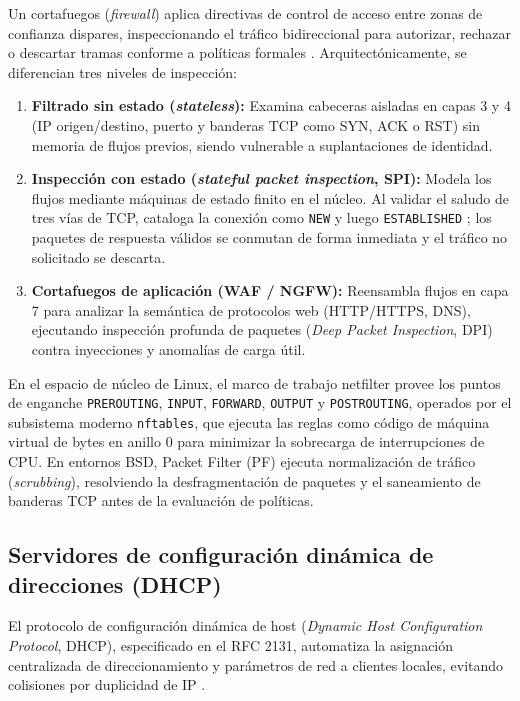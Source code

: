 \documentclass[12pt]{article}
\begin{document}
Un cortafuegos (\textit{firewall}) aplica directivas de control de acceso entre zonas de confianza dispares, inspeccionando el tráfico bidireccional para autorizar, rechazar o descartar tramas conforme a políticas formales \parencite[\S 19.3, pp.\ 942--944]{deitel2004operating}. Arquitectónicamente, se diferencian tres niveles de inspección:
\begin{enumerate}[noitemsep, topsep=1pt, parsep=0pt]
    \item \textbf{Filtrado sin estado (\textit{stateless}):} Examina cabeceras aisladas en capas 3 y 4 (IP origen/destino, puerto y banderas TCP como SYN, ACK o RST) sin memoria de flujos previos, siendo vulnerable a suplantaciones de identidad.
    \item \textbf{Inspección con estado (\textit{stateful packet inspection}, SPI):} Modela los flujos mediante máquinas de estado finito en el núcleo. Al validar el saludo de tres vías de TCP, cataloga la conexión como \texttt{NEW} y luego \texttt{ESTABLISHED} \parencite[\S 19.3, p.\ 943]{deitel2004operating}; los paquetes de respuesta válidos se conmutan de forma inmediata y el tráfico no solicitado se descarta.
    \item \textbf{Cortafuegos de aplicación (WAF / NGFW):} Reensambla flujos en capa 7 para analizar la semántica de protocolos web (HTTP/HTTPS, DNS), ejecutando inspección profunda de paquetes (\textit{Deep Packet Inspection}, DPI) contra inyecciones y anomalías de carga útil.
\end{enumerate}

En el espacio de núcleo de Linux, el marco de trabajo netfilter provee los puntos de enganche \texttt{PREROUTING}, \texttt{INPUT}, \texttt{FORWARD}, \texttt{OUTPUT} y \texttt{POSTROUTING}, operados por el subsistema moderno \texttt{nftables}, que ejecuta las reglas como código de máquina virtual de bytes en anillo 0 para minimizar la sobrecarga de interrupciones de CPU. En entornos BSD, Packet Filter (PF) ejecuta normalización de tráfico (\textit{scrubbing}), resolviendo la desfragmentación de paquetes y el saneamiento de banderas TCP antes de la evaluación de políticas.

\subsection{Servidores de configuración dinámica de direcciones (DHCP)}
\label{sec:servidoresDhcp}

El protocolo de configuración dinámica de host (\textit{Dynamic Host Configuration Protocol}, DHCP), especificado en el RFC 2131, automatiza la asignación centralizada de direccionamiento y parámetros de red a clientes locales, evitando colisiones por duplicidad de IP \parencite[\S 1, pp.\ 1--4]{rfc2131}.
\end{document}

